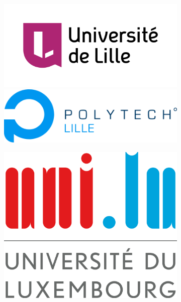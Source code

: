 	\begin{titlepage}

		\begin{figure}[t]
			\begin{subfigure}[h]{0.5\linewidth}
				\centering
				\includegraphics[scale=0.15]{media/universite_lille.png}
				\hspace*{20pt}
				\includegraphics[scale=0.2]{media/polytech_lille.png}
			\end{subfigure}
			\begin{subfigure}[h]{0.5\linewidth}
				\centering
				\includegraphics[scale=0.12]{media/universite_luxembourg.png}
			\end{subfigure}


\end{figure}
\end{titlepage}

